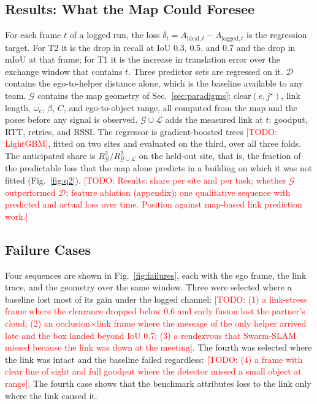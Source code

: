 \documentclass[conference]{IEEEtran}
\newcommand{\todo}[1]{\textcolor{red}{[TODO: #1]}}
\begin{document}
\subsection{Results: What the Map Could Foresee}
\label{sec:q2}
For each frame $t$ of a logged run, the loss
$\delta_t = A_{\mathrm{ideal},t} - A_{\mathrm{logged},t}$ is the
regression target. For T2 it is the drop in recall at IoU 0.3, 0.5,
and 0.7 and the drop in mIoU at that frame; for T1 it is the increase
in translation error over the exchange window that contains $t$.
Three predictor sets are regressed on it. $\mathcal{D}$ contains the
ego-to-helper distance alone, which is the baseline available to any
team. $\mathcal{G}$ contains the map geometry of
Sec.~\ref{sec:paradigms}: $\mathrm{clear}(e,j^\star)$, link length,
$\omega_e$, $\beta$, $C$, and ego-to-object range, all computed from
the map and the poses before any signal is observed.
$\mathcal{G}\cup\mathcal{L}$ adds the measured link at $t$: goodput,
RTT, retries, and RSSI. The regressor is gradient-boosted trees
\todo{LightGBM}, fitted on two sites and evaluated on the third, over
all three folds. The anticipated share is
$R^2_{\mathcal{G}} / R^2_{\mathcal{G}\cup\mathcal{L}}$ on the held-out
site, that is, the fraction of the predictable loss that the map
alone predicts in a building on which it was not fitted
(Fig.~\ref{fig:q2}). \todo{Results: share per site and per task;
whether $\mathcal{G}$ outperformed $\mathcal{D}$; feature ablation
(appendix); one qualitative sequence with predicted and actual loss
over time. Position against map-based link prediction work.}



\subsection{Failure Cases}
\label{sec:failures}
Four sequences are shown in Fig.~\ref{fig:failures}, each with the
ego frame, the link trace, and the geometry over the same window.
Three were selected where a baseline lost most of its gain under the
logged channel: \todo{(1) a link-stress frame where the clearance
dropped below 0.6 and early fusion lost the partner's cloud; (2) an
occlusion$\times$link frame where the message of the only helper
arrived late and the box landed beyond IoU 0.7; (3) a rendezvous that
Swarm-SLAM missed because the link was down at the meeting}. The
fourth was selected where the link was intact and the baseline
failed regardless: \todo{(4) a frame with clear line of sight and
full goodput where the detector missed a small object at range}. The
fourth case shows that the benchmark attributes loss to the link only
where the link caused it.
\end{document}
